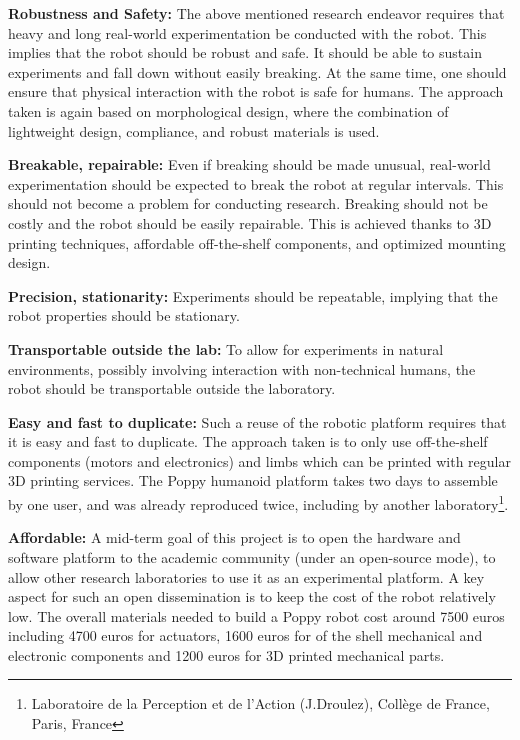 \textbf{Robustness and Safety:} The above mentioned research endeavor requires that heavy and long real-world experimentation be conducted with the robot.
This implies that the robot should be robust and safe.
It should be able to sustain experiments and fall down without easily breaking.
At the same time, one should ensure that physical interaction with the robot is safe for humans.
The approach taken is again based on morphological design, where the combination of lightweight design, compliance, and robust materials is used.

\textbf{Breakable, repairable:} Even if breaking should be made unusual, real-world experimentation should be expected to break the robot at regular intervals.
This should not become a problem for conducting research.
Breaking should not be costly and the robot should be easily repairable.
This is achieved thanks to 3D printing techniques, affordable off-the-shelf components, and optimized mounting design.

\textbf{Precision, stationarity:} Experiments should be repeatable, implying that the robot properties should be stationary.

\textbf{Transportable outside the lab:} To allow for experiments in natural environments, possibly involving interaction with non-technical humans, the robot should be transportable outside the laboratory.

\textbf{Easy and fast to duplicate:} Such a reuse of the robotic platform requires that it is easy and fast to duplicate.
The approach taken is to only use off-the-shelf components (motors and electronics) and limbs which can be printed with regular 3D printing services.
The Poppy humanoid platform takes two days to assemble by one user, and was already reproduced twice, including by another laboratory\footnote{Laboratoire de la Perception et de l'Action (J.Droulez), Collège de France, Paris, France\label{LPPA}}.

\textbf{Affordable:} A mid-term goal of this project is to open the hardware and software platform to the academic community (under an open-source mode), to allow other research laboratories to use it as an experimental platform.
A key aspect for such an open dissemination is to keep the cost of the robot relatively low.
The overall materials needed to build a Poppy robot cost around 7500 euros including 4700 euros for actuators, 1600 euros for of the shell mechanical and electronic components and 1200 euros for 3D printed mechanical parts.


